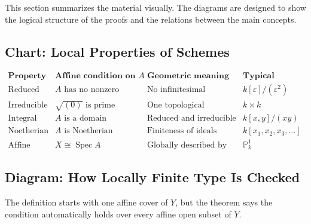 \documentclass[12pt,a4paper]{article}
\theoremstyle{notespace}
\begin{document}
This section summarizes the material visually. The diagrams are designed to show the logical structure of the proofs and the relations between the main concepts.

\subsection{Chart: Local Properties of Schemes}

\[
\begin{array}{c|c|c|c}
	\textbf{Property} 
	& \textbf{Affine condition on } A
	& \textbf{Geometric meaning}
	& \textbf{Typical failure}
	\\
	\hline
	\text{Reduced}
	&
	A \text{ has no nonzero nilpotents}
	&
	\text{No infinitesimal thickening}
	&
	k[\varepsilon]/(\varepsilon^2)
	\\
	\hline
	\text{Irreducible}
	&
	\sqrt{(0)} \text{ is prime}
	&
	\text{One topological component}
	&
	k\times k
	\\
	\hline
	\text{Integral}
	&
	A \text{ is a domain}
	&
	\text{Reduced and irreducible}
	&
	k[x,y]/(xy)
	\\
	\hline
	\text{Noetherian}
	&
	A \text{ is Noetherian}
	&
	\text{Finiteness of ideals locally}
	&
	k[x_1,x_2,x_3,\dots]
	\\
	\hline
	\text{Affine}
	&
	X\cong \operatorname{Spec}A
	&
	\text{Globally described by one ring}
	&
	\mathbb{P}^1_k
\end{array}
\]

\subsection{Diagram: How Locally Finite Type Is Checked}

The definition starts with one affine cover of \(Y\), but the theorem says the condition automatically holds over every affine open subset of \(Y\).
\end{document}
